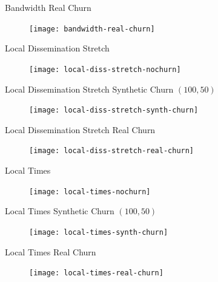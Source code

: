 \begin{frame}{Bandwidth Real Churn}
	\begin{figure}
		\texttt{[image: bandwidth-real-churn]}
	\end{figure}
\end{frame}

\begin{frame}{Local Dissemination Stretch}
	\begin{figure}
		\texttt{[image: local-diss-stretch-nochurn]}
	\end{figure}
\end{frame}

\begin{frame}{Local Dissemination Stretch Synthetic Churn $(100,50)$}
	\begin{figure}
		\texttt{[image: local-diss-stretch-synth-churn]}
	\end{figure}
\end{frame}

\begin{frame}{Local Dissemination Stretch Real Churn}
	\begin{figure}
		\texttt{[image: local-diss-stretch-real-churn]}
	\end{figure}
\end{frame}

\begin{frame}{Local Times}
	\begin{figure}
		\texttt{[image: local-times-nochurn]}
	\end{figure}
\end{frame}

\begin{frame}{Local Times Synthetic Churn $(100,50)$}
	\begin{figure}
		\texttt{[image: local-times-synth-churn]}
	\end{figure}
\end{frame}

\begin{frame}{Local Times Real Churn}
	\begin{figure}
		\texttt{[image: local-times-real-churn]}
	\end{figure}
\end{frame}

